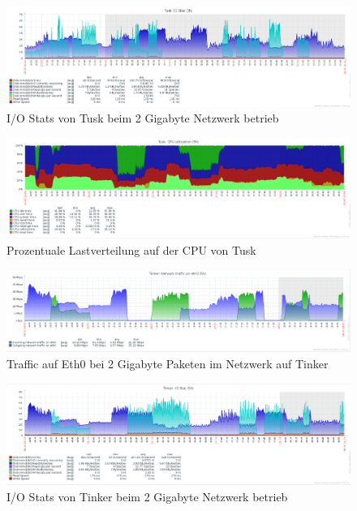\begin{figure}[htbp]
\centering
\includegraphics*[width=0.9\linewidth, angle=90]{Abb/ZabbixTusk/Standard/IoStatStandard2000}

\caption{I/O Stats von Tusk beim 2 Gigabyte Netzwerk betrieb}
\label{fig:IoStatTusk2000}
\end{figure} %

\begin{figure}[htbp]
\centering
\includegraphics*[width=0.9\linewidth, angle=90]{Abb/ZabbixTusk/Standard/CPUStandard2000}

\caption{Prozentuale Lastverteilung auf der CPU von Tusk}
\label{fig:CPUTusk2000}
\end{figure}

\begin{figure}[htbp]
\centering
\includegraphics*[width=0.9\linewidth, angle=90]{Abb/ZabbixTinker/Standard/Standard2000}

\caption{Traffic auf Eth0 bei 2 Gigabyte Paketen im Netzwerk auf Tinker}
\label{fig:Eth0Tinker2000}
\end{figure}


\begin{figure}[htbp]
\centering
\includegraphics*[width=0.9\linewidth, angle=90]{Abb/ZabbixTinker/Standard/IoStatStandard2000}

\caption{I/O Stats von Tinker beim 2 Gigabyte Netzwerk betrieb}
\label{fig:IoStatTinker2000}
\end{figure} %


